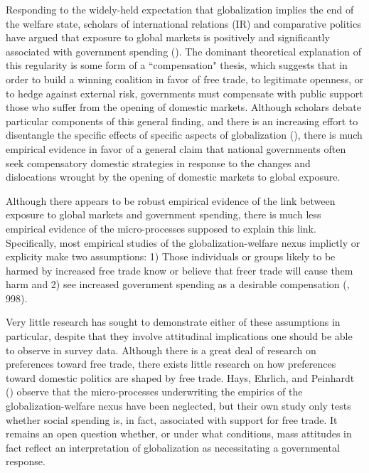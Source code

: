 \documentclass[12pt]{report}
\begin{document}
Responding to the widely-held expectation that globalization implies the end of the welfare
state, scholars of international relations (IR) and comparative politics have argued that
exposure to global markets is positively and significantly associated with government spending
(\citealt{Cameron:1978vb, Ruggie:1982wx, Katzenstein:1985ub, Baek:2009vq, Rodrik:1998te, Garrett:1995tj, Garrett:1998wl, Adsera:2002vt}). The dominant theoretical explanation of this regularity is some form of a
``compensation" thesis, which suggests that in order to build a winning coalition in favor of
free trade, to legitimate openness, or to hedge against external risk, governments must
compensate with public support those who suffer from the opening of domestic markets. Although
scholars debate particular components of this general finding, and there is an increasing effort
to disentangle the specific effects of specific aspects of globalization (\citealt{Burgoon:2001dp}), there
is much empirical evidence in favor of a general claim that national governments often seek
compensatory domestic strategies in response to the changes and dislocations wrought by the
opening of domestic markets to global exposure.
	
Although there appears to be robust empirical evidence of the link between exposure to global
markets and government spending, there is much less empirical evidence of the micro-processes
supposed to explain this link. Specifically, most empirical studies of the globalization-welfare
nexus implictly or explicity make two assumptions: 1) Those individuals or groups likely to be
harmed by increased free trade know or believe that freer trade will cause them harm and 2) see
increased government spending as a desirable compensation (\citealt{Rodrik:1998te}, 998).

Very little research has sought to demonstrate either of these assumptions in particular,
despite that they involve attitudinal implications one should be able to observe in survey data.
Although there is a great deal of research on preferences toward free trade, there exists little
research on how preferences toward domestic politics are shaped by free trade. Hays, Ehrlich,
and Peinhardt (\citeyear{Hays:2005vo}) observe that the micro-processes underwriting the empirics of the
globalization-welfare nexus have been neglected, but their own study only tests whether social
spending is, in fact, associated with support for free trade. It remains an open question
whether, or under what conditions, mass attitudes in fact reflect an interpretation of
globalization as necessitating a governmental response.
\end{document}
